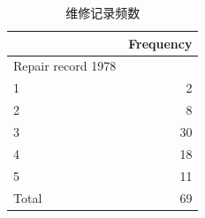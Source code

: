 \begin{table}[htbp]
  \centering
  \caption{ 维修记录频数 }
  \label{tab:tab1d}
  \small
  \begin{tabular}{ll}
    \toprule
    \multicolumn{1}{c}{} &
      \multicolumn{1}{r}{Frequency} \\
    \midrule
    \multicolumn{1}{l}{Repair record 1978} &
      \multicolumn{1}{r}{} \\
    \multicolumn{1}{l}{\hspace{1em}1} &
      \multicolumn{1}{r}{2} \\
    \multicolumn{1}{l}{\hspace{1em}2} &
      \multicolumn{1}{r}{8} \\
    \multicolumn{1}{l}{\hspace{1em}3} &
      \multicolumn{1}{r}{30} \\
    \multicolumn{1}{l}{\hspace{1em}4} &
      \multicolumn{1}{r}{18} \\
    \multicolumn{1}{l}{\hspace{1em}5} &
      \multicolumn{1}{r}{11} \\
    \multicolumn{1}{l}{\hspace{1em}Total} &
      \multicolumn{1}{r}{69} \\
    \bottomrule
  \end{tabular}
\end{table}
